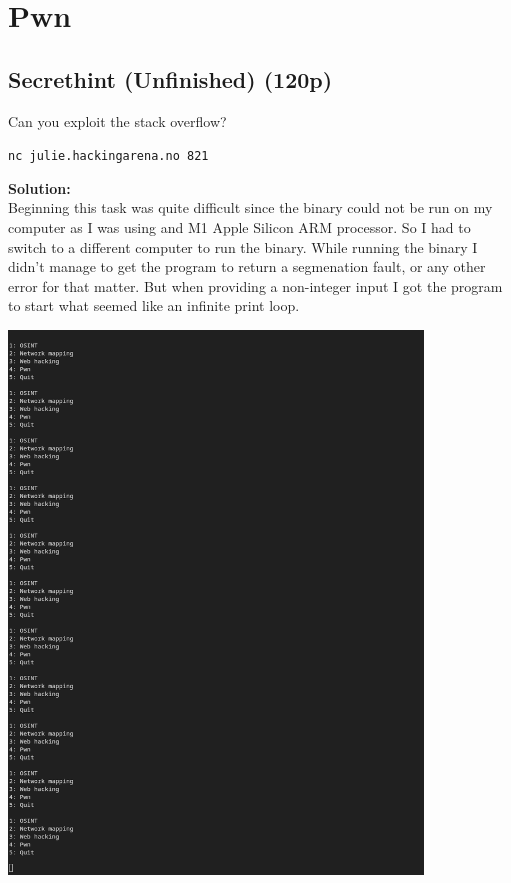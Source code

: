 \section{Pwn}

\subsection{Secrethint (Unfinished) (120p)}

Can you exploit the stack overflow?

\texttt{nc julie.hackingarena.no 821}

\textbf{Solution:}\\
Beginning this task was quite difficult since the binary could not be run on my computer as I was using and M1 Apple Silicon ARM processor.
So I had to switch to a different computer to run the binary.
While running the binary I didn't manage to get the program to return a segmenation fault, or any other error for that matter. But when providing a non-integer input I got the program to start what seemed like an infinite print loop.

\begin{center}
    \includegraphics[width=11cm]{img/Pwn/Screenshot from 2023-11-24 23-39-39.png}
\end{center}